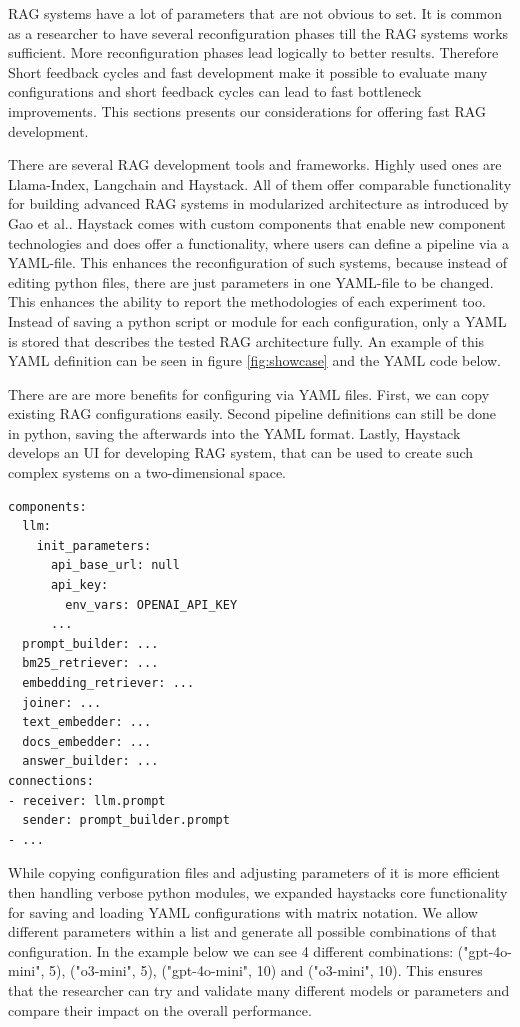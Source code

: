 RAG systems have a lot of parameters that are not obvious to set. It is common as a researcher to have several reconfiguration phases till the RAG systems works sufficient. More reconfiguration phases lead logically to better results. Therefore Short feedback cycles and fast development make it possible to evaluate many configurations and short feedback cycles can lead to fast bottleneck improvements. This sections presents our considerations for offering fast RAG development.

There are several RAG development tools and frameworks. Highly used ones are Llama-Index\cite{Liu_LlamaIndex_2022}, Langchain\cite{Chase_LangChain_2022} and Haystack\cite{Pietsch_Haystack_the_end-to-end_2019}. All of them offer comparable functionality for building advanced RAG systems in modularized architecture as introduced by Gao et al.\cite{Gao.18.12.2023}. Haystack comes with custom components that enable new component technologies and does offer a functionality, where users can define a pipeline via a YAML-file. This enhances the reconfiguration of such systems, because instead of editing python files, there are just parameters in one YAML-file to be changed. This enhances the ability to report the methodologies of each experiment too. Instead of saving a python script or module for each configuration, only a YAML is stored that describes the tested RAG architecture fully. An example of this YAML definition can be seen in figure \ref{fig:showcase} and the YAML code below.

There are are more benefits for configuring via YAML files. First, we can copy existing RAG configurations easily. Second pipeline definitions can still be done in python, saving the afterwards into the YAML format. Lastly, Haystack develops an UI\cite{haystack-ui} for developing RAG system, that can be used to create such complex systems on a two-dimensional space.

\begin{verbatim}
components:
  llm:
    init_parameters:
      api_base_url: null
      api_key:
        env_vars: OPENAI_API_KEY
      ...
  prompt_builder: ...
  bm25_retriever: ...
  embedding_retriever: ...
  joiner: ...
  text_embedder: ...
  docs_embedder: ...
  answer_builder: ...
connections:
- receiver: llm.prompt
  sender: prompt_builder.prompt
- ...
\end{verbatim}

While copying configuration files and adjusting parameters of it is more efficient then handling verbose python modules, we expanded haystacks core functionality for saving and loading YAML configurations with matrix notation.
We allow different parameters within a list and generate all possible combinations of that configuration. In the example below we can see 4 different combinations: ("gpt-4o-mini", 5), ("o3-mini", 5), ("gpt-4o-mini", 10) and ("o3-mini", 10). This ensures that the researcher can try and validate many different models or parameters and compare their impact on the overall performance.

